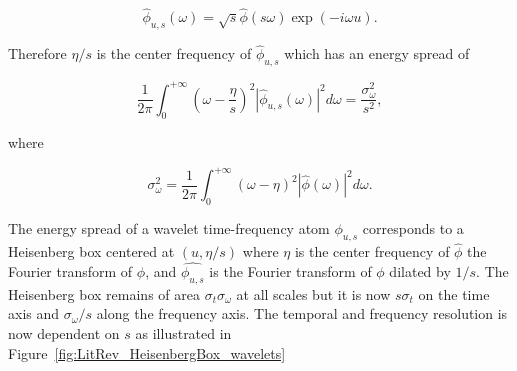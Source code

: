 \begin{equation}\label{eq:Mallat1999_453}
\hat{\phi}_{u,s}(\omega) = \sqrt{s}\hat{\phi}(s\omega) \exp{(-i\omega u)}.
\end{equation}

Therefore $\eta / s$ is the center frequency of $\hat{\phi}_{u,s}$ which has an energy spread of

\begin{equation}\label{eq:Mallat1999_454}
\frac{1}{2\pi} \int^{+\infty}_{0} \left( \omega - \frac{\eta}{s}\right)^2 \left| \hat{\phi}_{u,s}(\omega)\right|^2 d\omega = \frac{\sigma^2_\omega}{s^2},
\end{equation}

where

\begin{equation}\label{eq:Mallat1999_4545}
\sigma^2_\omega = \frac{1}{2\pi} \int^{+\infty}_0 (\omega - \eta)^2 |\hat{\phi}(\omega)|^2 d\omega.
\end{equation}

The energy spread of a wavelet time-frequency atom $\phi_{u,s}$ corresponds to a Heisenberg box centered at $(u,\eta/s)$ where $\eta$ is the center frequency of $\hat{\phi}$ the Fourier transform of $\phi$, and $\hat{\phi_{u,s}}$ is the Fourier transform of $\phi$ dilated by $1/s$. The Heisenberg box remains of area $\sigma_t \sigma_\omega$ at all scales but it is now $s\sigma_t$ on the time axis and $\sigma_\omega /s$ along the frequency axis\cite{Mallat1999}. The temporal and frequency resolution is now dependent on $s$ as illustrated in Figure~\ref{fig:LitRev_HeisenbergBox_wavelets}





